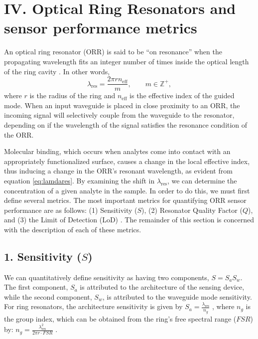 \documentclass[aps,prl,twocolumn, superscriptaddress,nobalancelastpage]{revtex4}
\begin{document}
\section{IV. Optical Ring Resonators and sensor performance metrics}
\vspace{-1em}

An optical ring resonator (ORR) is said to be ``on resonance'' when the propagating wavelength fits an integer number of times inside the optical length of the ring cavity \cite{sipORRs}. In other words, 
\begin{equation}
    \lambda_\text{res} = \frac{2\pi r n_\text{eff}}{m}, \qquad m \in \mathbb{Z}^+,
    \label{eq:lamdares}
\end{equation}
where $r$ is the radius of the ring and $n_\text{eff}$ is the effective index of the guided mode. When an input waveguide is placed in close proximity to an ORR, the incoming signal will selectively couple from the waveguide to the resonator, depending on if the wavelength of the signal satisfies the resonance condition of the ORR.

Molecular binding, which occurs when analytes come into contact with an appropriately functionalized surface, causes a change in the local effective index, thus inducing a change in the ORR's resonant wavelength, as evident from equation \eqref{eq:lamdares}. By examining the shift in $\lambda_\text{res}$, we can determine the concentration of a given analyte in the sample. In order to do this, we must first define several metrics. The most important metrics for quantifying ORR sensor performance are as follows: (1) Sensitivity ($S$), (2) Resonator Quality Factor ($Q$), and (3) the Limit of Detection (LoD) \cite{sipresonators}. The remainder of this section is concerned with the description of each of these metrics.

\vspace{-1em}
\subsection{1. Sensitivity ($S$)}
\vspace{-1em}

We can quantitatively define sensitivity as having two components, $S= S_aS_w$. The first component, $S_a$ is attributed to the architecture of the sensing device, while the second component, $S_w$, is attributed to the waveguide mode sensitivity. For ring resonators, the architecture sensitivity is given by $S_a = \frac{\lambda_\text{res}}{n_g}$ \cite{swg1}, where $n_g$ is the group index, which can be obtained from the ring's free spectral range ($FSR$) by: $n_g = \frac{\lambda_\text{res}^2}{2\pi r \cdot FSR}$ \cite{swg3}.
\end{document}
